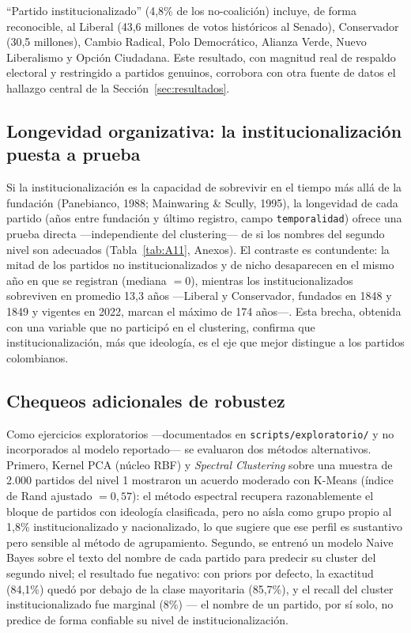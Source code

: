 \documentclass[11pt,letterpaper]{article}
\newcommand{\code}[1]{\texttt{\small #1}}
\begin{document}
``Partido institucionalizado'' (4,8\% de los no-coalición) incluye, de forma reconocible, al Liberal (43,6 millones de votos históricos al Senado), Conservador (30,5 millones), Cambio Radical, Polo Democrático, Alianza Verde, Nuevo Liberalismo y Opción Ciudadana. Este resultado, con magnitud real de respaldo electoral y restringido a partidos genuinos, corrobora con otra fuente de datos el hallazgo central de la Sección~\ref{sec:resultados}.

\subsection{Longevidad organizativa: la institucionalización puesta a prueba}

Si la institucionalización es la capacidad de sobrevivir en el tiempo más allá de la fundación (Panebianco, 1988; Mainwaring \& Scully, 1995), la longevidad de cada partido (años entre fundación y último registro, campo \code{temporalidad}) ofrece una prueba directa ---independiente del clustering--- de si los nombres del segundo nivel son adecuados (Tabla~\ref{tab:A11}, Anexos). El contraste es contundente: la mitad de los partidos no institucionalizados y de nicho desaparecen en el mismo año en que se registran (mediana $=0$), mientras los institucionalizados sobreviven en promedio 13,3 años ---Liberal y Conservador, fundados en 1848 y 1849 y vigentes en 2022, marcan el máximo de 174 años---. Esta brecha, obtenida con una variable que no participó en el clustering, confirma que institucionalización, más que ideología, es el eje que mejor distingue a los partidos colombianos.

\subsection{Chequeos adicionales de robustez}
\label{sec:robustez}

Como ejercicios exploratorios ---documentados en \code{scripts/exploratorio/} y no incorporados al modelo reportado--- se evaluaron dos métodos alternativos. Primero, Kernel PCA (núcleo RBF) y \emph{Spectral Clustering} sobre una muestra de 2.000 partidos del nivel 1 mostraron un acuerdo moderado con K-Means (índice de Rand ajustado $=0,57$): el método espectral recupera razonablemente el bloque de partidos con ideología clasificada, pero no aísla como grupo propio al 1,8\% institucionalizado y nacionalizado, lo que sugiere que ese perfil es sustantivo pero sensible al método de agrupamiento. Segundo, se entrenó un modelo Naive Bayes sobre el texto del nombre de cada partido para predecir su cluster del segundo nivel; el resultado fue negativo: con priors por defecto, la exactitud (84,1\%) quedó por debajo de la clase mayoritaria (85,7\%), y el recall del cluster institucionalizado fue marginal (8\%) --- el nombre de un partido, por sí solo, no predice de forma confiable su nivel de institucionalización.
\end{document}
